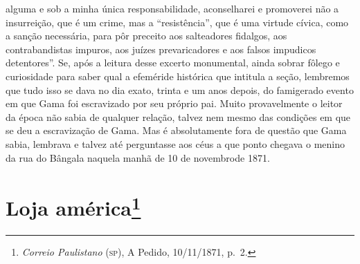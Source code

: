 {\begin{argumento}
{alguma e sob a minha única responsabilidade, aconselharei e promoverei
não a insurreição, que é um crime, mas a ``resistência'', que é uma
virtude cívica, como a sanção necessária, para pôr preceito aos
salteadores fidalgos, aos contrabandistas impuros, aos juízes
prevaricadores e aos falsos impudicos detentores''. Se, após a leitura
desse excerto monumental, ainda sobrar fôlego e curiosidade para saber
qual a efeméride histórica que intitula a seção, lembremos que tudo isso
se dava no dia exato, trinta e um anos depois, do famigerado evento em
que Gama foi escravizado por seu próprio pai. Muito provavelmente o
leitor da época não sabia de qualquer relação, talvez nem mesmo das
condições em que se deu a escravização de Gama. Mas é absolutamente fora
de questão que Gama sabia, lembrava e talvez até perguntasse aos céus a
que ponto chegava o menino da rua do Bângala naquela manhã de 10 de
novembrode 1871.}
\end{argumento}

\chapter{Loja américa\footnote{\emph{Correio Paulistano} (\textsc{sp}), A Pedido, 10/11/1871,
  p.~2.}} %

}
